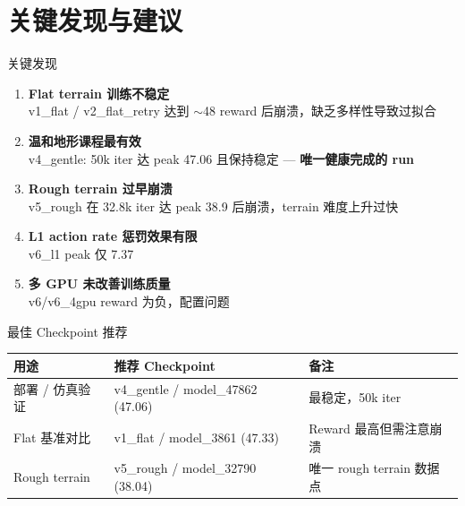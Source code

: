 \documentclass[aspectratio=169, 10pt, xcolor=dvipsnames]{beamer}
\begin{document}
\section{关键发现与建议}

\begin{frame}{关键发现}
  \begin{enumerate}
    \item \textbf{Flat terrain 训练不稳定} \\
          v1\_flat / v2\_flat\_retry 达到 $\sim$48 reward 后崩溃，缺乏多样性导致过拟合
    \item \textbf{温和地形课程最有效} \\
          v4\_gentle: 50k iter 达 peak 47.06 且保持稳定 — \textcolor{healthgreen}{\textbf{唯一健康完成的 run}}
    \item \textbf{Rough terrain 过早崩溃} \\
          v5\_rough 在 32.8k iter 达 peak 38.9 后崩溃，terrain 难度上升过快
    \item \textbf{L1 action rate 惩罚效果有限} \\
          v6\_l1 peak 仅 7.37
    \item \textbf{多 GPU 未改善训练质量} \\
          v6/v6\_4gpu reward 为负，配置问题
  \end{enumerate}
\end{frame}

\begin{frame}{最佳 Checkpoint 推荐}
  \centering
  \begin{tabular}{lll}
    \toprule
    \textbf{用途} & \textbf{推荐 Checkpoint} & \textbf{备注} \\
    \midrule
    \rowcolor{bestrow}
    部署 / 仿真验证 & v4\_gentle / model\_47862 (47.06) & 最稳定，50k iter \\
    Flat 基准对比 & v1\_flat / model\_3861 (47.33) & Reward 最高但需注意崩溃 \\
    Rough terrain & v5\_rough / model\_32790 (38.04) & 唯一 rough terrain 数据点 \\
    \bottomrule
  \end{tabular}
\end{frame}
\end{document}
